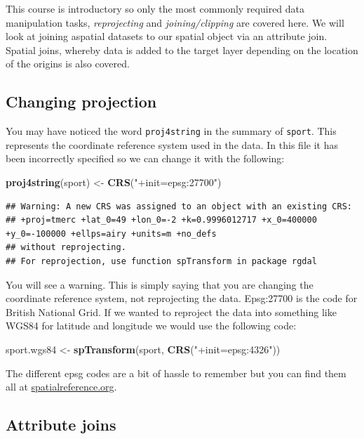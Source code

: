 \documentclass[]{article}
\newenvironment{Shaded}{}{}
\newcommand{\KeywordTok}[1]{\textcolor[rgb]{0.00,0.44,0.13}{\textbf{{#1}}}}
\newcommand{\StringTok}[1]{\textcolor[rgb]{0.25,0.44,0.63}{{#1}}}
\newcommand{\NormalTok}[1]{{#1}}
\begin{document}
This course is introductory so only the most commonly required data
manipulation tasks, \emph{reprojecting} and \emph{joining/clipping} are
covered here. We will look at joining aspatial datasets to our spatial
object via an attribute join. Spatial joins, whereby data is added to
the target layer depending on the location of the origins is also
covered.

\subsection{Changing projection}

You may have noticed the word \texttt{proj4string} in the summary of
\texttt{sport}. This represents the coordinate reference system used in
the data. In this file it has been incorrectly specified so we can
change it with the following:

\begin{Shaded}
\begin{Highlighting}[]
\KeywordTok{proj4string}\NormalTok{(sport) <- }\KeywordTok{CRS}\NormalTok{(}\StringTok{"+init=epsg:27700"}\NormalTok{)}
\end{Highlighting}
\end{Shaded}
\begin{verbatim}
## Warning: A new CRS was assigned to an object with an existing CRS:
## +proj=tmerc +lat_0=49 +lon_0=-2 +k=0.9996012717 +x_0=400000 +y_0=-100000 +ellps=airy +units=m +no_defs
## without reprojecting.
## For reprojection, use function spTransform in package rgdal
\end{verbatim}
You will see a warning. This is simply saying that you are changing the
coordinate reference system, not reprojecting the data. Epsg:27700 is
the code for British National Grid. If we wanted to reproject the data
into something like WGS84 for latitude and longitude we would use the
following code:

\begin{Shaded}
\begin{Highlighting}[]
\NormalTok{sport.wgs84 <- }\KeywordTok{spTransform}\NormalTok{(sport, }\KeywordTok{CRS}\NormalTok{(}\StringTok{"+init=epsg:4326"}\NormalTok{))}
\end{Highlighting}
\end{Shaded}
The different epsg codes are a bit of hassle to remember but you can
find them all at
\href{http://spatialreference.org/}{spatialreference.org}.

\subsection{Attribute joins}
\end{document}
